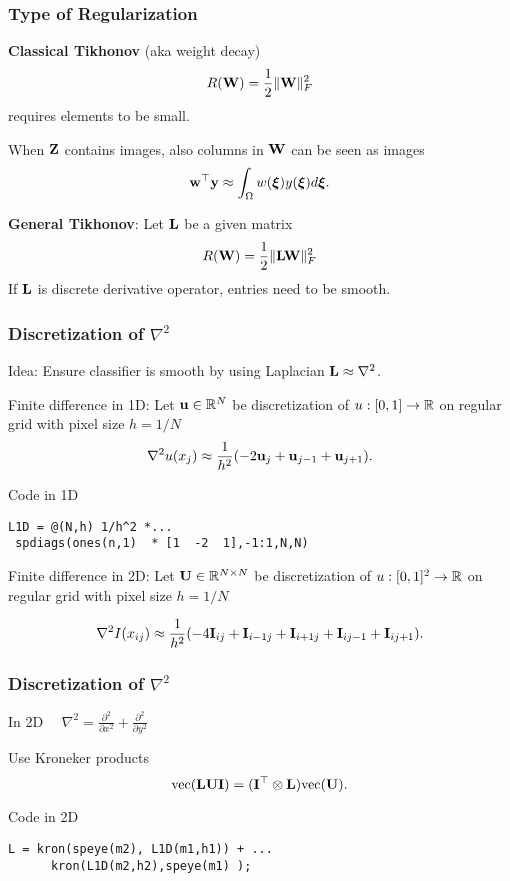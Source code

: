 \documentclass[12pt,fleqn,handout]{beamer}
\begin{document}
\begin{frame}\frametitle{Type of Regularization}

{\bf Classical Tikhonov} (aka weight decay) \\
$$ R({\bf W}) = {\frac 12} \|{\bf W}\|_F^2 $$
requires elements to be small.

\bigskip

When ${\bf Z}$ contains images, also columns in ${\bf W}$ can be seen as images
$$ {\bf w}^{\top} {\bf y} \approx \int_{\Omega} w({\boldsymbol \xi}) y({\boldsymbol \xi}) d{\boldsymbol \xi}. $$

{\bf General Tikhonov}: Let ${\bf L}$ be a given matrix \\
$$ R({\bf W}) = {\frac 12} \|{\bf L} {\bf W}\|_F^2 $$
If ${\bf L}$ is discrete derivative operator, entries need to be smooth.

\end{frame}

\begin{frame}[fragile]\frametitle{Discretization of $\nabla^2$}
	
	Idea: Ensure classifier is smooth by using  Laplacian ${\bf L} \approx \nabla^2$.
	
	\bigskip
	\pause

Finite difference in 1D: 	Let ${\bf u} \in \mathbb{R}^{N}$ be discretization of $u: [0,1] \to \mathbb{R}$ on regular grid with pixel size $h=1/N$
$$ \nabla^2 u(x_j) \approx  {\frac 1 {h^2}} (-2 {\bf u}_{j} +  {\bf u}_{j-1} + {\bf u}_{j+1}). $$

\bigskip
\pause
Code in 1D
\begin{verbatim}
L1D = @(N,h) 1/h^2 *...
 spdiags(ones(n,1)  * [1  -2  1],-1:1,N,N)
\end{verbatim}


\bigskip
\pause

Finite difference in 2D: Let ${\bf U} \in \mathbb{R}^{N\times N}$ be discretization of $u: [0,1]^2 \to \mathbb{R}$ on regular grid with pixel size $h=1/N$

$$ \nabla^2 I(x_{ij}) \approx  {\frac 1 {h^2}} (-4 {\bf I}_{ij} + {\bf I}_{i-1j} + {\bf I}_{i+1j} + {\bf I}_{ij-1} + {\bf I}_{ij+1}). $$


\bigskip


\end{frame}


\begin{frame}[fragile]\frametitle{Discretization of $\nabla^2$}

In 2D $\quad \nabla^2 = {\frac {\partial^2}{\partial x^2}} + {\frac {\partial^2}{\partial y^2}} $


\bigskip

Use Kroneker products
$$ {\rm vec}({\bf L} {\bf U} {\bf I}) = ({\bf I}^{\top} \otimes {\bf L}) {\rm vec} ({\bf U}). $$


Code in 2D
\begin{verbatim}
L = kron(speye(m2), L1D(m1,h1)) + ...
      kron(L1D(m2,h2),speye(m1) );
\end{verbatim}

\end{frame}
\end{document}
